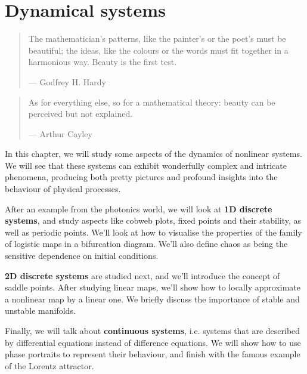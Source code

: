 \chapter{Dynamical systems}
\label{h:dynamical}

\begin{quote}
The mathematician's patterns, like the painter's or the poet's must be beautiful; the ideas, like the colours or the words must fit together in a harmonious way. Beauty is the first test.

--- Godfrey H. Hardy
\end{quote}

\begin{quote}
As for everything else, so for a mathematical theory: beauty can be perceived but not explained.

--- Arthur Cayley
\end{quote}

\chaptertoc

In this chapter, we will study some aspects of the dynamics of nonlinear systems. We will see that these systems can exhibit wonderfully complex and intricate phenomena, producing both pretty pictures and profound insights into the behaviour of physical processes.

After an example from the photonics world, we will look at \textbf{1D discrete systems}, and study aspects like cobweb plots, fixed points and their stability, as well as periodic points. We'll look at how to visualise the properties of the family of logistic maps in a bifurcation diagram. We'll also define chaos as being the sensitive dependence on initial conditions.

\textbf{2D discrete systems} are studied next, and we'll introduce the concept of saddle points. After studying linear maps, we'll show how to locally approximate a nonlinear map by a linear one. We briefly discuss the importance of stable and unstable manifolds.

Finally, we will talk about \textbf{continuous systems}, i.e. systems that are described by differential equations instead of difference equations. We will show how to use phase portraits to represent their behaviour, and finish with the famous example of the Lorentz attractor.

\pagebreak


